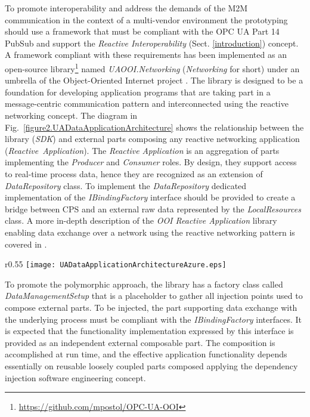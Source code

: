 \documentclass[runningheads]{llncs}
\begin{document}
To promote interoperability and address the demands of the M2M communication in the context of a multi-vendor environment the prototyping should use a framework that must be compliant with the OPC UA Part 14 PubSub and support the \emph{Reactive Interoperability} (Sect. \ref{introduction}) concept. A framework compliant with these requirements has been implemented as an open-source library\footnote{\url{https://github.com/mpostol/OPC-UA-OOI}} named \emph{UAOOI.Networking} (\emph{Networking} for short) under an umbrella of the Object-Oriented Internet project \cite{mariusz_postol_2020_4361640}. The library is designed to be a foundation for developing application programs that are taking part in a message-centric communication pattern and interconnected using the reactive networking concept. The diagram in Fig.~\ref{figure2.UADataApplicationArchitecture} shows the relationship between the library (\emph{SDK}) and external parts composing any reactive networking application (\emph{Reactive\ Application}). The \emph{Reactive Application} is an aggregation of parts implementing the \emph{Producer} and \emph{Consumer} roles. By design, they support access to real-time process data, hence they are recognized as an extension of \emph{DataRepository} class. To implement the \emph{DataRepository} dedicated implementation of the \emph{IBindingFactory} interface should be provided to create a bridge between CPS and an external raw data represented by the \emph{LocalResources} class. A more in-depth description of the \emph{OOI Reactive Application} library enabling data exchange over a network using the reactive networking pattern is covered in \cite{mpostol2020}.

\begin{wrapfigure}{r}{0.55\textwidth}
      \texttt{[image: UADataApplicationArchitectureAzure.eps]}
      \caption{Reactive interoperability architecture}\label{figure2.UADataApplicationArchitecture}
\end{wrapfigure}

To promote the polymorphic approach, the library has a factory class called \emph{DataManagementSetup} that is a placeholder to gather all injection points used to compose external parts. To be injected, the part supporting data exchange with the underlying process must be compliant with the \emph{IBindingFactory} interfaces. It is expected that the functionality implementation expressed by this interface is provided as an independent external composable part. The composition is accomplished at run time, and the effective application functionality depends essentially on reusable loosely coupled parts composed applying the dependency injection software engineering concept.
\end{document}
